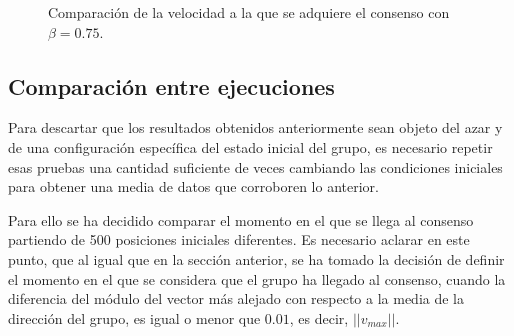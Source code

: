 \begin{figure}[htbp]
\centering
\caption{Comparación de la velocidad a la que se adquiere el consenso con $\beta=0.75$.} 
\label{fig:consenso_4models_b075}
\end{figure}

\subsection{Comparación entre ejecuciones}

Para descartar que los resultados obtenidos anteriormente sean objeto del azar y de una configuración específica del estado inicial del grupo, es necesario repetir esas pruebas una cantidad suficiente de veces cambiando las condiciones iniciales para obtener una media de datos que corroboren lo anterior.

Para ello se ha decidido comparar el momento en el que se llega al consenso partiendo de 500 posiciones iniciales diferentes. Es necesario aclarar en este punto, que al igual que en la sección anterior, se ha tomado la decisión de definir el momento en el que se considera que el grupo ha llegado al consenso, cuando la diferencia del módulo del vector más alejado con respecto a la media de la dirección del grupo, es igual o menor que $0.01$, es decir, $||v_{max}||$.

